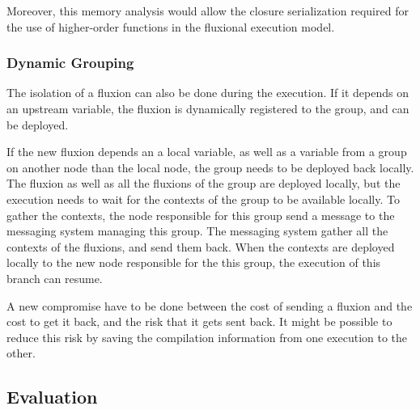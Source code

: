 Moreover, this memory analysis would allow the closure serialization required for the use of higher-order functions in the fluxional execution model.

\subsubsection{Dynamic Grouping}

The isolation of a fluxion can also be done during the execution.
If it depends on an upstream variable, the fluxion is dynamically registered to the group, and can be deployed.

If the new fluxion depends an a local variable, as well as a variable from a group on another node than the local node, the group needs to be deployed back locally.
The fluxion as well as all the fluxions of the group are deployed locally, but the execution needs to wait for the contexts of the group to be available locally.
To gather the contexts, the node responsible for this group send a message to the messaging system managing this group.
The messaging system gather all the contexts of the fluxions, and send them back.
When the contexts are deployed locally to the new node responsible for the this group, the execution of this branch can resume.

A new compromise have to be done between the cost of sending a fluxion and the cost to get it back, and the risk that it gets sent back.
It might be possible to reduce this risk by saving the compilation information from one execution to the other.


\subsection{Evaluation}





